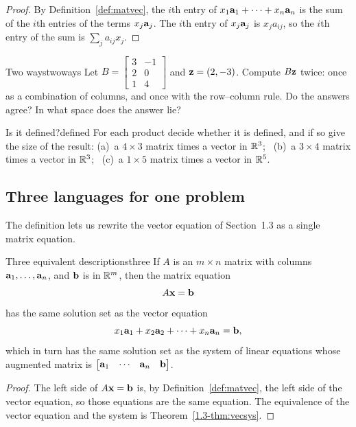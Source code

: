 \documentclass[11pt]{article}
\begin{document}
\begin{proof}
By Definition~\ref{def:matvec}, the $i$th entry of $x_1\mathbf{a}_1+\cdots+x_n\mathbf{a}_n$ is the sum of the $i$th entries of the terms
$x_j\mathbf{a}_j$. The $i$th entry of $x_j\mathbf{a}_j$ is $x_j a_{ij}$, so the $i$th entry of the sum is $\sum_j a_{ij}x_j$.
\end{proof}
 
\begin{kc}{Two ways}{twoways}
Let $B=\begin{bmatrix}3&-1\\2&0\\1&4\end{bmatrix}$ and $\mathbf{z}=(2,-3)$. Compute $B\mathbf{z}$ twice: once as a combination of columns, and once with the row--column
rule. Do the answers agree? In what space does the answer lie?
\end{kc}
 
\begin{kc}{Is it defined?}{defined}
For each product decide whether it is defined, and if so give the size of the result:
(a)~a $4\times3$ matrix times a vector in $\mathbb{R}^3$; \ (b)~a $3\times4$ matrix times a vector in $\mathbb{R}^3$; \ (c)~a $1\times5$ matrix times a vector in $\mathbb{R}^5$.
\end{kc}
 
\subsection*{Three languages for one problem}
 
The definition lets us rewrite the vector equation of Section~1.3 as a single matrix equation.
 
\begin{thm}{Three equivalent descriptions}{three}
If $A$ is an $m\times n$ matrix with columns $\mathbf{a}_1,\dots,\mathbf{a}_n$, and $\mathbf{b}$ is in $\mathbb{R}^m$, then the matrix equation
\[
A\mathbf{x}=\mathbf{b}
\]
has the same solution set as the vector equation
\[
x_1\mathbf{a}_1+x_2\mathbf{a}_2+\cdots+x_n\mathbf{a}_n=\mathbf{b},
\]
which in turn has the same solution set as the system of linear equations whose augmented matrix is
$\begin{bmatrix}\mathbf{a}_1&\cdots&\mathbf{a}_n&\mathbf{b}\end{bmatrix}$.
\end{thm}
 
\begin{proof}
The left side of $A\mathbf{x}=\mathbf{b}$ is, by Definition~\ref{def:matvec}, the left side of the vector equation, so those equations are the same
equation. The equivalence of the vector equation and the system is Theorem~\ref{1.3-thm:vecsys}.
\end{proof}
 
\end{document}
